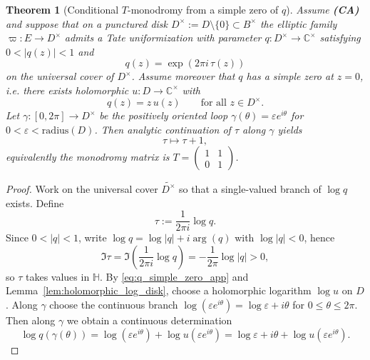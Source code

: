 \documentclass[11pt]{article}
\newtheorem{theorem}{Theorem}[section]
\theoremstyle{remark}
\begin{document}
{\begin{theorem}[Conditional $T$-monodromy from a simple zero of $q$]\label{thm:T_monodromy_conditional}
Assume \textbf{(CA)} and suppose that on a punctured disk $D^\times:=D\setminus\{0\}\subset B^\times$ the elliptic family $\varpi:E\to D^\times$ admits a Tate uniformization with parameter $q:D^\times\to\mathbb{C}^\times$ satisfying $0<|q(z)|<1$ and
\begin{equation}\label{eq:q_exp_tau}
q(z)=\exp(2\pi i\,\tau(z))
\end{equation}
on the universal cover of $D^\times$. Assume moreover that $q$ has a simple zero at $z=0$, i.e. there exists holomorphic $u:D\to\mathbb{C}^\times$ with
\begin{equation}\label{eq:q_simple_zero_app}
q(z)=z\,u(z)\qquad\text{for all }z\in D^\times.
\end{equation}
Let $\gamma:[0,2\pi]\to D^\times$ be the positively oriented loop $\gamma(\theta)=\varepsilon e^{i\theta}$ for $0<\varepsilon<\mathrm{radius}(D)$. Then analytic continuation of $\tau$ along $\gamma$ yields
\begin{equation}\label{eq:T_tau_shift}
\tau\longmapsto \tau+1,
\end{equation}
equivalently the monodromy matrix is $T=\begin{pmatrix}1&1\\ 0&1\end{pmatrix}$.
\end{theorem}
\begin{proof}
Work on the universal cover $\widetilde{D^\times}$ so that a single-valued branch of $\log q$ exists. Define
\begin{equation}\label{eq:tau_logq_def}
\tau:=\frac{1}{2\pi i}\log q.
\end{equation}
Since $0<|q|<1$, write $\log q=\log|q|+i\arg(q)$ with $\log|q|<0$, hence
\begin{equation}\label{eq:Imtau_positive_from_q}
\Im\tau=\Im\!\left(\frac{1}{2\pi i}\log q\right)=-\frac{1}{2\pi}\log|q|>0,
\end{equation}
so $\tau$ takes values in $\mathbb{H}$. By \eqref{eq:q_simple_zero_app} and Lemma~\ref{lem:holomorphic_log_disk}, choose a holomorphic logarithm $\log u$ on $D$. Along $\gamma$ choose the continuous branch $\log(\varepsilon e^{i\theta})=\log\varepsilon+i\theta$ for $0\le\theta\le 2\pi$. Then along $\gamma$ we obtain a continuous determination
\begin{equation}\label{eq:logq_along_gamma_app}
\log q(\gamma(\theta))=\log(\varepsilon e^{i\theta})+\log u(\varepsilon e^{i\theta})=\log\varepsilon+i\theta+\log u(\varepsilon e^{i\theta}).

\end{equation}
\end{proof}}
\end{document}
